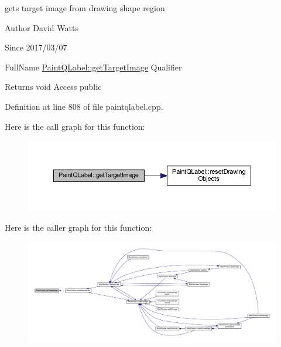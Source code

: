 gets target image from drawing shape region

\begin{DoxyAuthor}{Author}
David Watts 
\end{DoxyAuthor}
\begin{DoxySince}{Since}
2017/03/07
\end{DoxySince}
Full\+Name \hyperlink{class_paint_q_label_a409e0869a3115968f025878ad49d9883}{Paint\+Q\+Label\+::get\+Target\+Image} Qualifier \begin{DoxyReturn}{Returns}
void Access public 
\end{DoxyReturn}


Definition at line 808 of file paintqlabel.\+cpp.

Here is the call graph for this function\+:
\nopagebreak
\begin{figure}[H]
\begin{center}
\leavevmode
\includegraphics[width=350pt]{class_paint_q_label_a409e0869a3115968f025878ad49d9883_cgraph}
\end{center}
\end{figure}
Here is the caller graph for this function\+:
\nopagebreak
\begin{figure}[H]
\begin{center}
\leavevmode
\includegraphics[width=350pt]{class_paint_q_label_a409e0869a3115968f025878ad49d9883_icgraph}
\end{center}
\end{figure}
\mbox{\label{class_paint_q_label_a2ba7f833ed473795ad0e9f1ccb0f29b3}} 
